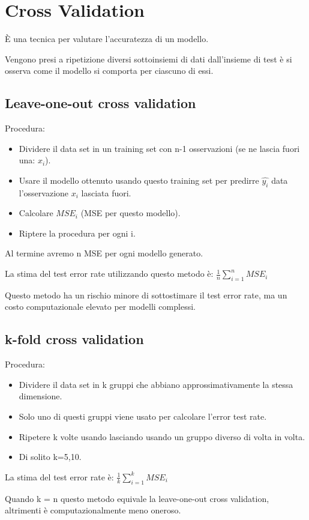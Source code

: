 \section{Cross Validation}

È una tecnica per valutare l'accuratezza di un modello.

Vengono presi a ripetizione diversi sottoinsiemi di dati
dall'insieme di test è si osserva come il modello si comporta per
ciascuno di essi.

\subsection{Leave-one-out cross validation}

Procedura:

\begin{itemize}
 \item Dividere il data set in un training set con n-1 osservazioni
(se ne lascia fuori una: $x_i$).
 \item Usare il modello ottenuto usando questo training set per predirre
$\hat{y_i}$ data l'osservazione $x_i$ lasciata fuori.
 \item Calcolare $MSE_i$ (MSE per questo modello).
 \item Riptere la procedura per ogni i.
\end{itemize}

Al termine avremo n MSE per ogni modello generato.

La stima del test error rate utilizzando questo metodo è:
$\frac{1}{n} \sum_{i=1}^n MSE_i$

Questo metodo ha un rischio minore di sottostimare il test
error rate, ma un costo computazionale elevato per modelli complessi.

\subsection{k-fold cross validation}

Procedura:

\begin{itemize}
 \item Dividere il data set in k gruppi che abbiano approssimativamente
la stessa dimensione.
 \item Solo uno di questi gruppi viene usato per calcolare l'error test
rate.
 \item Ripetere k volte usando lasciando usando un gruppo diverso
di volta in volta.
 \item Di solito k=5,10.
\end{itemize}

La stima del test error rate è: $\frac{1}{k} \sum_{i=1}^k MSE_i$

Quando k = n questo metodo equivale la leave-one-out cross validation,
altrimenti è computazionalmente meno oneroso.










